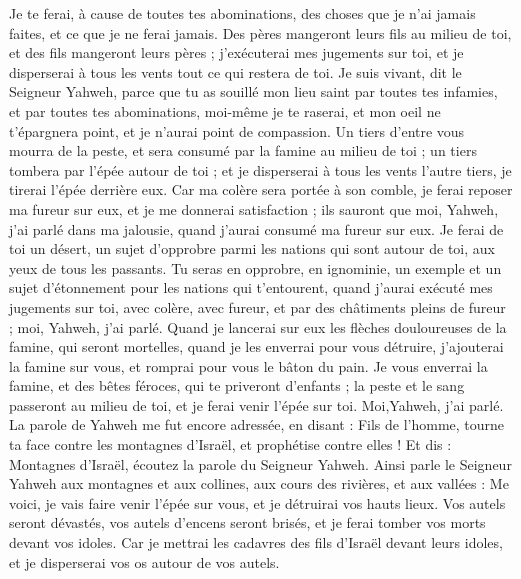\begin{multicols}{2}
Je te ferai, à cause de toutes tes abominations, des choses que je n’ai jamais faites,  et ce que je ne ferai jamais.
Des pères mangeront leurs fils au milieu de toi, et des fils mangeront leurs pères ; j'exécuterai mes jugements sur toi, et je disperserai à tous les vents tout ce qui restera de toi.
Je suis vivant, dit le Seigneur Yahweh, parce que tu as souillé mon lieu saint par toutes tes infamies, et par toutes tes abominations, moi-même je te raserai, et mon oeil ne t'épargnera point, et je n'aurai point de compassion.
Un tiers d'entre vous mourra de la peste, et sera consumé par la famine au milieu de toi ; un tiers tombera par l'épée autour de toi ; et je disperserai à tous les vents l'autre tiers, je tirerai l'épée derrière eux.
Car ma colère sera portée à son comble, je ferai reposer ma fureur sur eux, et je me donnerai satisfaction ; ils sauront que moi, Yahweh, j'ai parlé dans ma jalousie, quand j'aurai consumé ma fureur sur eux.
Je ferai de toi un désert, un sujet d’opprobre parmi les nations qui sont autour de toi, aux yeux de tous les passants.
Tu seras en opprobre, en ignominie, un exemple et un sujet d’étonnement pour les nations qui t’entourent, quand j'aurai exécuté mes jugements sur toi, avec colère, avec fureur, et par des châtiments pleins de fureur ; moi, Yahweh, j'ai parlé.
Quand je lancerai sur eux les flèches douloureuses de la famine, qui seront mortelles, quand je les enverrai pour vous détruire, j’ajouterai la famine sur vous, et romprai pour vous le bâton du pain.
Je vous enverrai la famine, et des bêtes féroces, qui te priveront d'enfants ; la peste et le sang passeront au milieu de toi, et je ferai venir l'épée sur toi. Moi,Yahweh, j'ai parlé.
\VerseOne{}La parole de Yahweh me fut encore adressée, en disant :
Fils de l’homme, tourne ta face contre les montagnes d'Israël, et prophétise contre elles !
Et dis : Montagnes d'Israël, écoutez la parole du Seigneur Yahweh. Ainsi parle le Seigneur Yahweh aux montagnes et aux collines, aux cours des rivières, et aux vallées : Me voici, je vais faire venir l'épée sur vous, et je détruirai vos hauts lieux.
Vos autels seront dévastés, vos autels d’encens seront brisés, et je ferai tomber vos morts devant vos idoles.
Car je mettrai les cadavres des fils d'Israël devant leurs idoles, et je disperserai vos os autour de vos autels.

\end{multicols}
